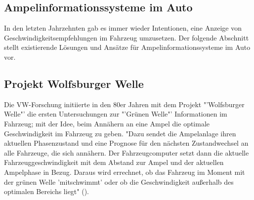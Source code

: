 \subsection{Ampelinformationssysteme im Auto}
In den letzten Jahrzehnten gab es immer wieder Intentionen, eine Anzeige von Geschwindigkeitsempfehlungen im Fahrzeug umzusetzen. Der folgende Abschnitt stellt existierende Lösungen und Ansätze für Ampelinformationssysteme im Auto vor.
\subsection*{Projekt Wolfsburger Welle}
Die VW-Forschung initiierte in den 80er Jahren mit dem Projekt "'Wolfsburger Welle"' die ersten Untersuchungen zur "'Grünen Welle"' Informationen im Fahrzeug; mit der Idee, beim Annähern an eine Ampel die optimale Geschwindigkeit im Fahrzeug zu geben.\cite{Welle} "Dazu sendet die Ampelanlage ihren aktuellen Phasenzustand und eine Prognose für den nächsten Zustandwechsel an alle Fahrzeuge, die sich annähern. Der Fahrzeugcomputer setzt dann die aktuelle Fahrzeuggeschwindigkeit mit dem Abstand zur Ampel und der aktuellen Ampelphase in Bezug. Daraus wird errechnet, ob das Fahrzeug im Moment mit der grünen Welle ’mitschwimmt’ oder ob die Geschwindigkeit außerhalb des optimalen Bereichs liegt" (\cite{MenschMaschine}).
